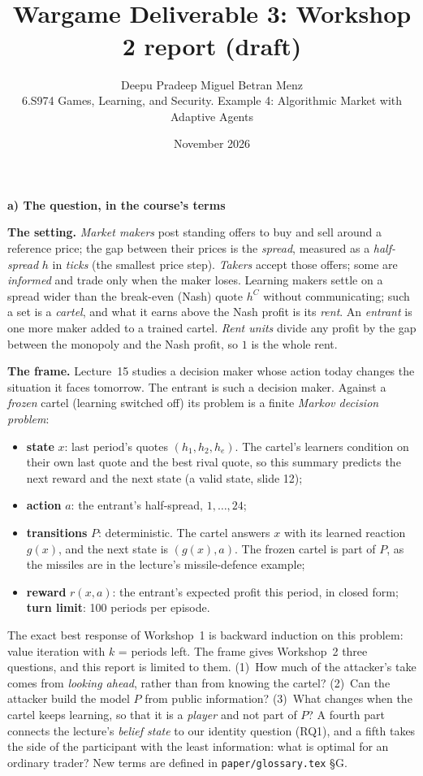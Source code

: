 \documentclass[10pt]{article}
\title{\vspace{-1.6em}{\Large\textbf{Rent or Toxicity? Strategic Exploitability of Learning Market Makers\\ with Public Wallet Information}}\\[0.15em]\large Wargame Deliverable 3: Workshop 2 report (draft)}
\author{Deepu Pradeep \quad Miguel Betran Menz\\
\normalsize 6.S974 Games, Learning, and Security. Example 4: Algorithmic Market with Adaptive Agents}
\date{November 2026}
\newcommand{\sect}[1]{\par\vspace{6pt}\noindent\textbf{#1}\par\vspace{1.5pt}\noindent}
\begin{document}
\maketitle
\vspace{-2em}

\sect{a) The question, in the course's terms}
\textbf{The setting.} \emph{Market makers} post standing offers to buy and sell around a reference price; the gap between their prices is the \emph{spread}, measured as a \emph{half-spread} $h$ in \emph{ticks} (the smallest price step). \emph{Takers} accept those offers; some are \emph{informed} and trade only when the maker loses. Learning makers settle on a spread wider than the break-even (Nash) quote $h^C$ without communicating; such a set is a \emph{cartel}, and what it earns above the Nash profit is its \emph{rent}. An \emph{entrant} is one more maker added to a trained cartel. \emph{Rent units} divide any profit by the gap between the monopoly and the Nash profit, so $1$ is the whole rent.

\textbf{The frame.} Lecture~15 studies a decision maker whose action today changes the situation it faces tomorrow. The entrant is such a decision maker. Against a \emph{frozen} cartel (learning switched off) its problem is a finite \emph{Markov decision problem}:
\begin{itemize}
\item \textbf{state} $x$: last period's quotes $(h_1,h_2,h_e)$. The cartel's learners condition on their own last quote and the best rival quote, so this summary predicts the next reward and the next state (a valid state, slide 12);
\item \textbf{action} $a$: the entrant's half-spread, $1,\dots,24$;
\item \textbf{transitions} $P$: deterministic. The cartel answers $x$ with its learned reaction $g(x)$, and the next state is $(g(x),a)$. The frozen cartel is part of $P$, as the missiles are in the lecture's missile-defence example;
\item \textbf{reward} $r(x,a)$: the entrant's expected profit this period, in closed form; \textbf{turn limit}: 100 periods per episode.
\end{itemize}
The exact best response of Workshop~1 is backward induction on this problem: value iteration with $k$ = periods left. The frame gives Workshop~2 three questions, and this report is limited to them. (1)~How much of the attacker's take comes from \emph{looking ahead}, rather than from knowing the cartel? (2)~Can the attacker build the model $P$ from public information? (3)~What changes when the cartel keeps learning, so that it is a \emph{player} and not part of $P$? A fourth part connects the lecture's \emph{belief state} to our identity question (RQ1), and a fifth takes the side of the participant with the least information: what is optimal for an ordinary trader? New terms are defined in \texttt{paper/glossary.tex} \S G.
\end{document}
